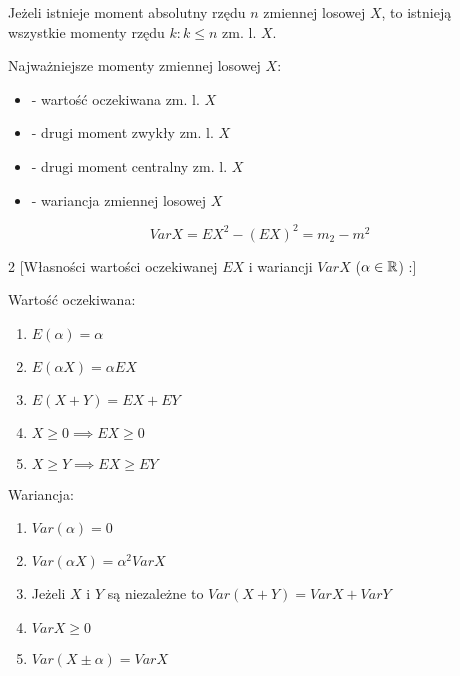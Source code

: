 \documentclass[../Matematyka.tex]{subfiles}
\begin{document}
Jeżeli istnieje moment absolutny rzędu \(n\) zmiennej losowej \(X\), to istnieją wszystkie momenty rzędu \(k : k \leq n\) zm. l. \(X\).

Najważniejsze momenty zmiennej losowej \(X\):
\begin{itemize}
    \item {}         - wartość oczekiwana zm. l. \(X\)
    \item {}       - drugi moment zwykły zm. l. \(X\)
    \item {} - drugi moment centralny zm. l. \(X\)
    \item {}     - wariancja zmiennej losowej \(X\)
\end{itemize}

\[VarX = EX^2 - (EX)^2 = m_2 - m^2\]

\newpage
\begin{multicols}{2}
    [Własności wartości oczekiwanej \(EX\) i wariancji \(VarX\) (\(\alpha \in \mathbb{R}\)) :]
    \begin{center}
        Wartość oczekiwana:
    \end{center}
    \begin{enumerate}
        \item \(E(\alpha) = \alpha\)
        \item \(E(\alpha X) = \alpha EX\)
        \item \(E(X + Y) = EX + EY\)
        \item \(X \geq 0 \implies EX \geq 0\)
        \item \(X \geq Y \implies EX \geq EY\)
    \end{enumerate}

    \begin{center}
        Wariancja:
    \end{center}
    \begin{enumerate}
        \item \(Var(\alpha) = 0\)
        \item \(Var(\alpha X) = \alpha^2 VarX\)
        \item Jeżeli \(X\) i \(Y\) są niezależne to \(Var(X + Y) = VarX + VarY\)
        \item \(VarX \geq 0\)
        \item \(Var(X \pm \alpha) = VarX\)
    \end{enumerate}
\end{multicols}
\end{document}

